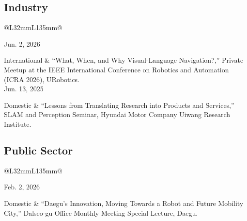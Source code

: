 \documentclass[10pt,a4paper]{article}
\makeatletter
\newcommand{\daterow}[2]{#1 & #2 \\[2.2pt]}
\newcommand{\talkcategory}[1]{\titlespacing*{\subsection}{0pt}{4pt}{1pt}\Needspace{5\baselineskip}\subsection{#1}}
\newcommand{\talkbadge}[1]{%
  {\setlength{\fboxsep}{2pt}\sffamily\scriptsize
  \ifstrequal{#1}{International}{\colorbox{internationalbg}{\textcolor{internationaltext}{#1}}}{%
    \ifstrequal{#1}{DGIST}{\colorbox{internationalbg}{\textcolor{internationaltext}{#1}}}{\colorbox{domesticbg}{#1}}}}%
}
\newcommand{\talkrow}[3]{#1\par\vspace{1pt}\talkbadge{#2} & #3 \\[2pt]}
\newenvironment{talktable}{%
  \small
  \renewcommand{\daterow}[2]{##1 & ##2 \\[0.4pt]}%
  \setlength{\LTpre}{2pt}%
  \setlength{\LTpost}{2pt}%
  \begin{longtable}{@{}L{32mm}L{135mm}@{}}
}{\end{longtable}}
\makeatother
\begin{document}
\talkcategory{Industry}
\begin{talktable}
\talkrow{Jun. 2, 2026}{International}{``What, When, and Why Visual-Language Navigation?,'' Private Meetup at the IEEE International Conference on Robotics and Automation (ICRA 2026), URobotics.}
\talkrow{Jun. 13, 2025}{Domestic}{``Lessons from Translating Research into Products and Services,'' SLAM and Perception Seminar, Hyundai Motor Company Uiwang Research Institute.}
\end{talktable}

\talkcategory{Public Sector}
\begin{talktable}
\talkrow{Feb. 2, 2026}{Domestic}{``Daegu's Innovation, Moving Towards a Robot and Future Mobility City,'' Dalseo-gu Office Monthly Meeting Special Lecture, Daegu.}
\end{talktable}
\end{document}
